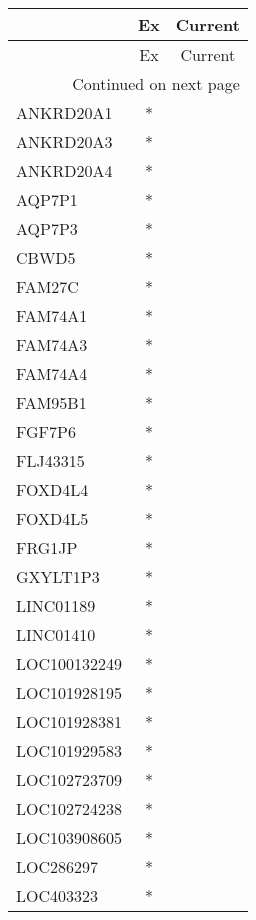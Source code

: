 \begin{longtable}{lcc}
\toprule
{} & Ex & Current \\
\midrule
\endfirsthead

\toprule
{} & Ex & Current \\
\midrule
\endhead
\midrule
\multicolumn{3}{r}{{Continued on next page}} \\
\midrule
\endfoot

\bottomrule
\endlastfoot
ANKRD20A1          &  * &         \\
ANKRD20A3          &  * &         \\
ANKRD20A4          &  * &         \\
AQP7P1             &  * &         \\
AQP7P3             &  * &         \\
CBWD5              &  * &         \\
FAM27C             &  * &         \\
FAM74A1            &  * &         \\
FAM74A3            &  * &         \\
FAM74A4            &  * &         \\
FAM95B1            &  * &         \\
FGF7P6             &  * &         \\
FLJ43315           &  * &         \\
FOXD4L4            &  * &         \\
FOXD4L5            &  * &         \\
FRG1JP             &  * &         \\
GXYLT1P3           &  * &         \\
LINC01189          &  * &         \\
LINC01410          &  * &         \\
LOC100132249       &  * &         \\
LOC101928195       &  * &         \\
LOC101928381       &  * &         \\
LOC101929583       &  * &         \\
LOC102723709       &  * &         \\
LOC102724238       &  * &         \\
LOC103908605       &  * &         \\
LOC286297          &  * &         \\
LOC403323          &  * &         \\

\end{longtable}
